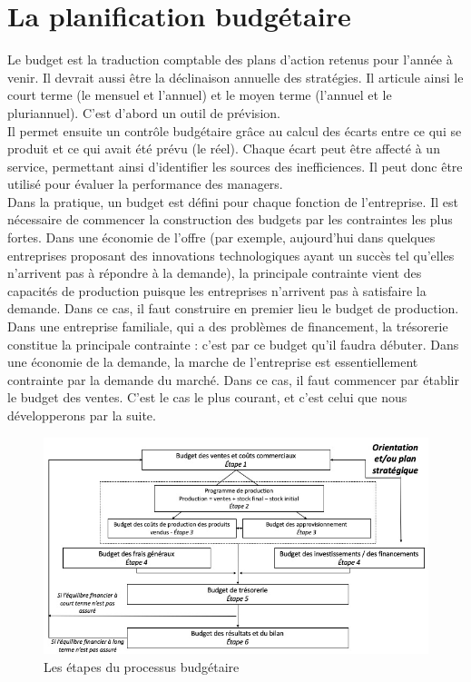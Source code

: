\documentclass{kaobook}
\begin{document}
\section{La planification budgétaire}
\label{sec:org3b095e1}
Le budget est la traduction comptable des plans d'action retenus pour l'année à venir. Il devrait aussi être la déclinaison annuelle des stratégies. Il articule ainsi le court terme (le mensuel et l'annuel) et le moyen terme (l'annuel et le pluriannuel). C'est d'abord un outil de prévision.\\
Il permet ensuite un contrôle budgétaire grâce au calcul des écarts entre ce qui se produit et ce qui avait été prévu (le réel). Chaque écart peut être affecté à un service, permettant ainsi d'identifier les sources des inefficiences. Il peut donc être utilisé pour évaluer la performance des managers.\\

Dans la pratique, un budget est défini pour chaque fonction de l'entreprise. Il est nécessaire de commencer la construction des budgets par les contraintes les plus fortes. Dans une économie de l'offre (par exemple, aujourd'hui dans quelques entreprises proposant des innovations technologiques ayant un succès tel qu'elles n'arrivent pas à répondre à la demande), la principale contrainte vient des capacités de production puisque les entreprises n'arrivent pas à satisfaire la demande. Dans ce cas, il faut construire en premier lieu le budget de production.\\

Dans une entreprise familiale, qui a des problèmes de financement, la trésorerie constitue la principale contrainte : c'est par ce budget qu'il faudra débuter. Dans une économie de la demande, la marche de l'entreprise est essentiellement contrainte par la demande du marché. Dans ce cas, il faut commencer par établir le budget des ventes. C'est le cas le plus courant, et c'est celui que nous développerons par la suite.\\

\begin{figure}[htbp]
\centering
\includegraphics[width=.9\linewidth]{./img/budget.jpeg}
\caption{Les étapes du processus budgétaire}
\end{figure}
\end{document}

